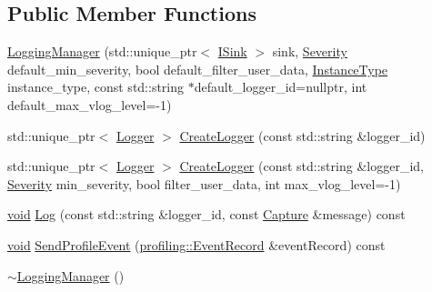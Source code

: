 \subsection*{Public Member Functions}
\begin{DoxyCompactItemize}
\item 
\mbox{\hyperlink{classonnxruntime_1_1logging_1_1LoggingManager_ae088e9104f76dd12ce446bed84d734a4}{Logging\+Manager}} (std\+::unique\+\_\+ptr$<$ \mbox{\hyperlink{classonnxruntime_1_1logging_1_1ISink}{I\+Sink}} $>$ sink, \mbox{\hyperlink{namespaceonnxruntime_1_1logging_a7daeb33e1b0e6a6df8c23d142af78e81}{Severity}} default\+\_\+min\+\_\+severity, bool default\+\_\+filter\+\_\+user\+\_\+data, \mbox{\hyperlink{classonnxruntime_1_1logging_1_1LoggingManager_af3489102aaa98cc9b30fcd5ac641eef6}{Instance\+Type}} instance\+\_\+type, const std\+::string $\ast$default\+\_\+logger\+\_\+id=nullptr, int default\+\_\+max\+\_\+vlog\+\_\+level=-\/1)
\item 
std\+::unique\+\_\+ptr$<$ \mbox{\hyperlink{classonnxruntime_1_1logging_1_1Logger}{Logger}} $>$ \mbox{\hyperlink{classonnxruntime_1_1logging_1_1LoggingManager_a0060fb2bb4d5830fce54cf312ce308bb}{Create\+Logger}} (const std\+::string \&logger\+\_\+id)
\item 
std\+::unique\+\_\+ptr$<$ \mbox{\hyperlink{classonnxruntime_1_1logging_1_1Logger}{Logger}} $>$ \mbox{\hyperlink{classonnxruntime_1_1logging_1_1LoggingManager_a9029481638625330691349c45085bf2b}{Create\+Logger}} (const std\+::string \&logger\+\_\+id, \mbox{\hyperlink{namespaceonnxruntime_1_1logging_a7daeb33e1b0e6a6df8c23d142af78e81}{Severity}} min\+\_\+severity, bool filter\+\_\+user\+\_\+data, int max\+\_\+vlog\+\_\+level=-\/1)
\item 
\mbox{\hyperlink{mlasi_8h_a88f941d423cb2a819b70a1358982b1a6}{void}} \mbox{\hyperlink{classonnxruntime_1_1logging_1_1LoggingManager_a3aa5d44bfb4df7f535a4cf4478a00248}{Log}} (const std\+::string \&logger\+\_\+id, const \mbox{\hyperlink{classonnxruntime_1_1logging_1_1Capture}{Capture}} \&message) const
\item 
\mbox{\hyperlink{mlasi_8h_a88f941d423cb2a819b70a1358982b1a6}{void}} \mbox{\hyperlink{classonnxruntime_1_1logging_1_1LoggingManager_ab2338a7f41955d374a1b969ac314f395}{Send\+Profile\+Event}} (\mbox{\hyperlink{structonnxruntime_1_1profiling_1_1EventRecord}{profiling\+::\+Event\+Record}} \&event\+Record) const
\item 
\mbox{\hyperlink{classonnxruntime_1_1logging_1_1LoggingManager_af991a7ada953f9be436bc2089503e90a}{$\sim$\+Logging\+Manager}} ()
\end{DoxyCompactItemize}
